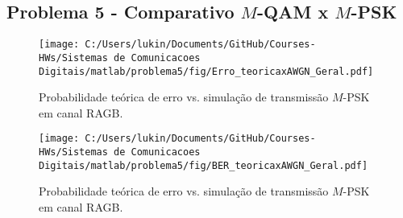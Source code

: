 \subsection{Problema 5 - Comparativo \texorpdfstring{$M$}{M}-QAM x \texorpdfstring{$M$}{M}-PSK}

\begin{figure}[!ht]
    \centering
    \texttt{[image: C:/Users/lukin/Documents/GitHub/Courses-HWs/Sistemas de Comunicacoes Digitais/matlab/problema5/fig/Erro\_teoricaxAWGN\_Geral.pdf]}
    \caption{Probabilidade teórica de erro vs. simulação de transmissão $M$-PSK em canal RAGB.}
    \label{fig:Erro_teoricaxAWGN_Geral}
\end{figure}

\begin{figure}[!ht]
    \centering
    \texttt{[image: C:/Users/lukin/Documents/GitHub/Courses-HWs/Sistemas de Comunicacoes Digitais/matlab/problema5/fig/BER\_teoricaxAWGN\_Geral.pdf]}
    \caption{Probabilidade teórica de erro vs. simulação de transmissão $M$-PSK em canal RAGB.}
    \label{fig:BER_teoricaxAWGN_Geral}
\end{figure}

